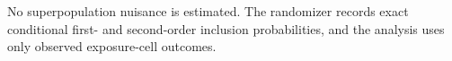 No superpopulation nuisance is estimated.  The randomizer records exact conditional first- and second-order inclusion probabilities, and the analysis uses only observed exposure-cell outcomes.